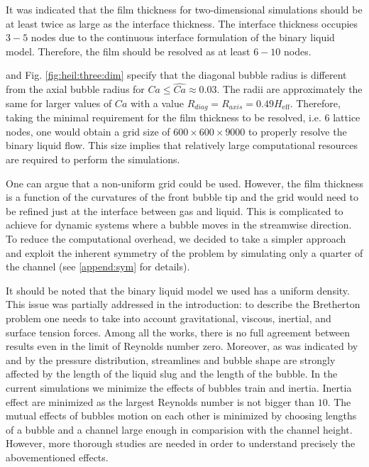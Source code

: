 \documentclass[preprint,12pt]{elsarticle}
\begin{document}
It was indicated \cite{kuzmin-binary2d} that the film thickness for two-dimensional simulations should be at least twice as large
as the interface thickness. The interface thickness occupies $3-5$ nodes due to the continuous
interface formulation of the binary liquid model. Therefore, the
film should be
resolved as at least $6-10$ nodes. 

\citet{heil-threedim} and Fig. \ref{fig:heil:three:dim} specify that the diagonal bubble radius is
different from the
axial bubble radius for $Ca\leq \widehat{Ca}\approx 0.03$. The radii are approximately the same for
larger values
of
$Ca$ with a value $R_{diag}=R_{axis}=0.49 H_{\mathrm{eff}}$. Therefore, taking the minimal
requirement for the film thickness to be
resolved, i.e. $6$ lattice nodes, one would obtain a grid size of $600\times 600 \times 9000 $ to
properly resolve the binary liquid flow. This size implies that relatively
large
computational resources are required to perform the simulations.

One can argue that a non-uniform grid could be used. However, the film thickness is a
function of the curvatures of the front bubble tip \cite{bretherton} and the grid would need to
be refined just at the interface between gas and liquid. This is complicated to achieve for
dynamic systems where a bubble moves in the streamwise direction.
To reduce the computational overhead, we decided to take a simpler approach and exploit the
inherent symmetry of the problem by simulating only a quarter of the channel (see
\ref{append:sym} for details).

It should be noted that the binary liquid model we used has a uniform density. This issue was
partially addressed in the introduction:  to describe the Bretherton problem one needs to take into
account gravitational, viscous, inertial, and surface tension forces. Among all the works, there
is no full 
agreement between results even in the limit of Reynolds number zero. Moreover,
as was indicated
by \citet{kreutzer-taylor} and by \citet{cerro-bubble-train} the pressure distribution, streamlines
and bubble shape are strongly affected by the length of the liquid slug and the length of the
bubble. In the current simulations we minimize the effects of bubbles train and inertia. Inertia
effect are minimized as the largest Reynolds number is not bigger than $10$. The mutual
effects of bubbles motion on each other is minimized by choosing lengths of a bubble and a
channel large enough in comparision with the channel height. However, more thorough studies are
needed in order to understand
precisely the abovementioned effects.
\end{document}

